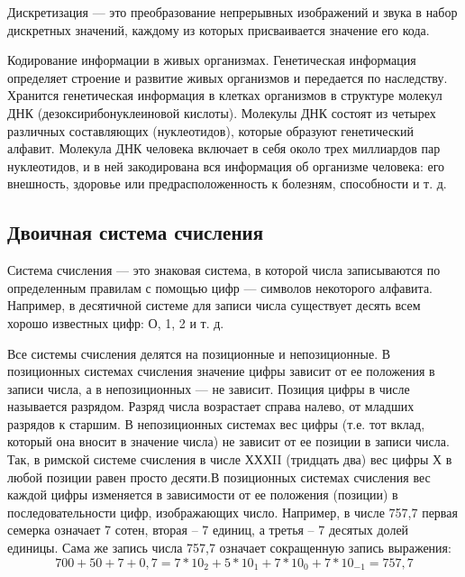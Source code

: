 \documentclass[a4paper]{article}
\begin{document}
 Дискретизация — это преобразование непрерывных изображений и звука в набор дискретных значений, каждому из которых присваивается значение его кода.

 Кодирование информации в живых организмах. Генетическая информация определяет строение и развитие живых организмов и передается по наследству. Хранится генетическая информация в клетках организмов в структуре молекул ДНК (дезоксирибонуклеиновой кислоты). Молекулы ДНК состоят из четырех различных составляющих (нуклеотидов), которые образуют генетический алфавит. Молекула ДНК человека включает в себя около трех миллиардов пар нуклеотидов, и в ней закодирована вся информация об организме человека: его внешность, здоровье или предрасположенность к болезням, способности и т. д.

\subsection{Двоичная система счисления}
Система счисления — это знаковая система, в которой числа записываются по определенным правилам с помощью цифр — символов некоторого алфавита. Например, в десятичной системе для записи числа существует десять всем хорошо известных цифр: О, 1, 2 и т. д.

Все системы счисления делятся на позиционные и непозиционные. В позиционных системах счисления значение цифры зависит от ее положения в записи числа, а в непозиционных — не зависит. Позиция цифры в числе называется разрядом. Разряд числа возрастает справа налево, от младших разрядов к старшим. В непозиционных системах вес цифры (т.е. тот вклад, который она вносит в значение числа) не зависит от ее позиции в записи числа. Так, в римской системе счисления в числе ХХХII (тридцать два) вес цифры Х в любой позиции равен просто десяти.В позиционных системах счисления вес каждой цифры изменяется в зависимости от ее положения (позиции) в последовательности цифр, изображающих число. Например, в числе 757,7 первая семерка означает 7 сотен, вторая – 7 единиц, а третья – 7 десятых долей единицы. Сама же запись числа 757,7 означает сокращенную запись выражения:
\begin{equation}
  700 + 50 + 7 + 0,7 = 7*10_{2} + 5*10_{1} + 7*10_{0} + 7*10_{-1} = 757,7
\end{equation}
\end{document}
